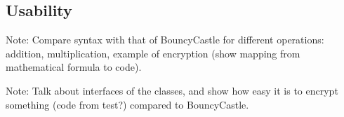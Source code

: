 \subsection{Usability}

Note: Compare syntax with that of BouncyCastle for different operations: addition, multiplication, example of encryption
(show mapping from mathematical formula to code).

Note: Talk about interfaces of the classes, and show how easy it is to encrypt something (code from test?) compared to
BouncyCastle.